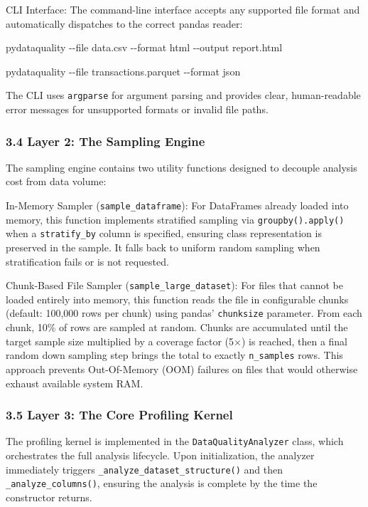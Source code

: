 \documentclass{article}
\begin{document}
CLI Interface: The command-line interface accepts any supported file
format and automatically dispatches to the correct pandas reader:

pydataquality -\/-file data.csv -\/-format html -\/-output report.html

pydataquality -\/-file transactions.parquet -\/-format json

The CLI uses \texttt{argparse} for argument parsing and provides clear,
human-readable error messages for unsupported formats or invalid file
paths.

\subsubsection{3.4 Layer 2: The Sampling
Engine}\label{layer-2-the-sampling-engine}

The sampling engine contains two utility functions designed to decouple
analysis cost from data volume:

In-Memory Sampler (\texttt{sample\_dataframe}): For DataFrames already
loaded into memory, this function implements stratified sampling via
\texttt{groupby().apply()} when a \texttt{stratify\_by} column is
specified, ensuring class representation is preserved in the sample. It
falls back to uniform random sampling when stratification fails or is
not requested.

Chunk-Based File Sampler (\texttt{sample\_large\_dataset}): For files
that cannot be loaded entirely into memory, this function reads the file
in configurable chunks (default: 100,000 rows per chunk) using pandas'
\texttt{chunksize} parameter. From each chunk, 10\% of rows are sampled
at random. Chunks are accumulated until the target sample size
multiplied by a coverage factor (5×) is reached, then a final random
down sampling step brings the total to exactly \texttt{n\_samples} rows.
This approach prevents Out-Of-Memory (OOM) failures on files that would
otherwise exhaust available system RAM.

\subsubsection{3.5 Layer 3: The Core Profiling
Kernel}\label{layer-3-the-core-profiling-kernel}

The profiling kernel is implemented in the \texttt{DataQualityAnalyzer}
class, which orchestrates the full analysis lifecycle. Upon
initialization, the analyzer immediately triggers
\texttt{\_analyze\_dataset\_structure()} and then
\texttt{\_analyze\_columns()}, ensuring the analysis is complete by the
time the constructor returns.
\end{document}
